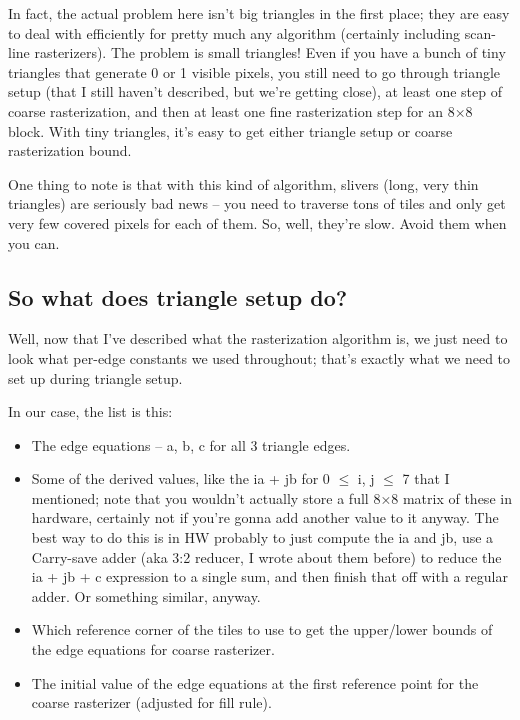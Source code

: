 \documentclass[12pt]{article}
\begin{document}
In fact, the actual problem here isn’t big triangles in the first place; they are easy to deal with efficiently for pretty much any algorithm (certainly including scan-line rasterizers). The problem is small triangles! Even if you have a bunch of tiny triangles that generate 0 or 1 visible pixels, you still need to go through triangle setup (that I still haven’t described, but we’re getting close), at least one step of coarse rasterization, and then at least one fine rasterization step for an 8×8 block. With tiny triangles, it’s easy to get either triangle setup or coarse rasterization bound.

One thing to note is that with this kind of algorithm, slivers (long, very thin triangles) are seriously bad news – you need to traverse tons of tiles and only get very few covered pixels for each of them. So, well, they’re slow. Avoid them when you can.

\subsection{So what does triangle setup do?}
\label{sec:orgc8816bc}

Well, now that I’ve described what the rasterization algorithm is, we just need to look what per-edge constants we used throughout; that’s exactly what we need to set up during triangle setup.

In our case, the list is this:

\begin{itemize}
\item The edge equations – a, b, c for all 3 triangle edges.
\item Some of the derived values, like the ia + jb for 0 \(\le\) i, j \(\le\) 7 that I mentioned; note that you wouldn’t actually store a full 8×8 matrix of these in hardware, certainly not if you’re gonna add another value to it anyway. The best way to do this is in HW probably to just compute the ia and jb, use a Carry-save adder (aka 3:2 reducer, I wrote about them before) to reduce the ia + jb + c expression to a single sum, and then finish that off with a regular adder. Or something similar, anyway.
\item Which reference corner of the tiles to use to get the upper/lower bounds of the edge equations for coarse rasterizer.
\item The initial value of the edge equations at the first reference point for the coarse rasterizer (adjusted for fill rule).
\end{itemize}
\end{document}
